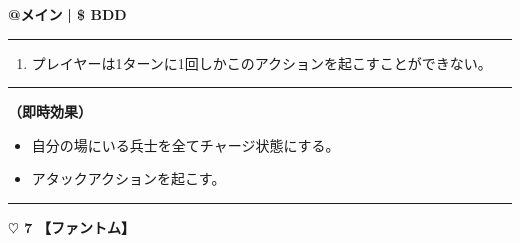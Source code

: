 \documentclass[twocolumn,a5paper,papersize,10pt]{jarticle}
\begin{document}
\begin{tcolorbox}[title={\small\bf【Action】追撃}{\scriptsize （通常魔法）}]

{\scriptsize\bf @メイン }
  {\scriptsize\bf | \$ BDD }

\vspace{1mm} %
\hrule height 0.1mm depth 0mm width 62mm %
\vspace{1mm} %


\vspace{-1zh}%
\begin{enumerate}
\renewcommand{\labelenumi}{※}
\setlength{\leftskip}{-0.3cm}
\setlength{\itemsep}{0pt} %
\setlength{\parskip}{0pt} %

\item プレイヤーは1ターンに1回しかこのアクションを起こすことができない。

\vspace{-3mm}%
\end{enumerate}
\vspace{-2mm} %
\vspace{1zh}%
\vspace{1mm} %
\hrule height 0.1mm depth 0mm width 62mm %
\vspace{1mm} %

{\bf（即時効果）}


\vspace{-1zh}%
\begin{itemize}
\setlength{\leftskip}{-0.3cm}
\setlength{\parskip}{0pt} %

\item 自分の場にいる兵士を全てチャージ状態にする。

\item アタックアクションを起こす。
\vspace{-1zh}%
\end{itemize}

\vspace{1mm} %
\end{tcolorbox}

\vspace{-1zh}
  
 

\vspace{3mm} %
\hrule height 0.5mm depth 0mm width 66.5mm %
\vspace{1mm} %
{\Large\bf $\heartsuit$ 7} {\normalsize\bf【ファントム】} %
\vspace{1mm} %
\end{document}
